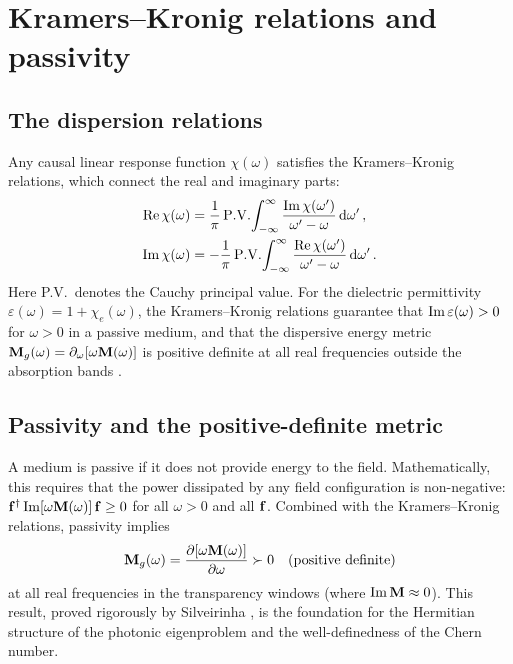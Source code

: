 \section{Kramers--Kronig relations and passivity} \cite{raman2010photonic,nittis2020equivalence}
\label{sec:appD-kramers-kronig}

\subsection{The dispersion relations}
\label{sec:appD-kk-derivation}

Any causal linear response function $\chi(\omega)$ satisfies the
Kramers--Kronig relations, which connect the real and imaginary parts:
\begin{align}
  \mathrm{Re}\,\chi(\omega)
  &= \frac{1}{\pi}\,\mathrm{P.V.}\!\int_{-\infty}^{\infty}
  \frac{\mathrm{Im}\,\chi(\omega')}{\omega'-\omega}\,\mathrm{d}\omega'\,,
  \label{eq:appD-kk-real}\\
  \mathrm{Im}\,\chi(\omega)
  &= -\frac{1}{\pi}\,\mathrm{P.V.}\!\int_{-\infty}^{\infty}
  \frac{\mathrm{Re}\,\chi(\omega')}{\omega'-\omega}\,\mathrm{d}\omega'\,.
  \label{eq:appD-kk-imag}
\end{align}
Here P.V.\ denotes the Cauchy principal value.  For the dielectric
permittivity $\varepsilon(\omega)=1+\chi_e(\omega)$, the Kramers--Kronig
relations guarantee that $\mathrm{Im}\,\varepsilon(\omega)>0$ for $\omega>0$
in a passive medium, and that the dispersive energy metric
$\mathbf{M}_g(\omega)=\partial_\omega[\omega\mathbf{M}(\omega)]$ is positive
definite at all real frequencies outside the absorption bands
\cite{gangaraj2016berry,silveirinha2016bulk}.

\subsection{Passivity and the positive-definite metric}
\label{sec:appD-passivity}

A medium is passive if it does not provide energy to the field.
Mathematically, this requires that the power dissipated by any field
configuration is non-negative:
$\mathbf{f}^\dagger\,\mathrm{Im}[\omega\mathbf{M}(\omega)]\,\mathbf{f}\geq 0$ for
all $\omega>0$ and all $\mathbf{f}$.  Combined with the Kramers--Kronig
relations, passivity implies \cite{gangaraj2016berry}
\begin{equation}\label{eq:appD-passivity}
  \mathbf{M}_g(\omega) = \frac{\partial[\omega\mathbf{M}(\omega)]}{\partial\omega}
  \succ 0
  \quad\text{(positive definite)}
\end{equation}
at all real frequencies in the transparency windows (where
$\mathrm{Im}\,\mathbf{M}\approx 0$).  This result, proved rigorously by
Silveirinha \cite{silveirinha2016bulk}, is the foundation for the
Hermitian structure of the photonic eigenproblem and the well-definedness
of the Chern number.

